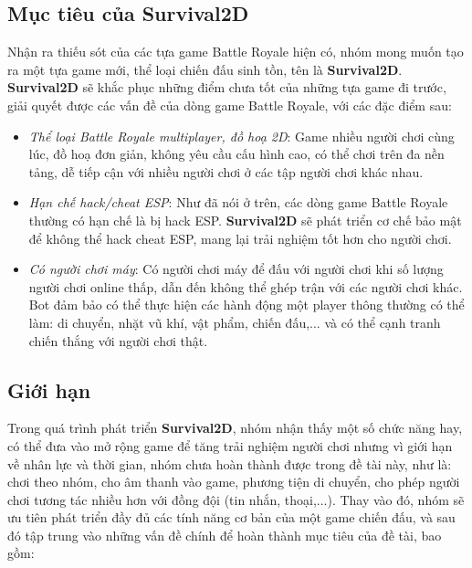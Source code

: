 \documentclass[12pt,a4paper]{article}
\begin{document}

  \subsection{Mục tiêu của Survival2D}

  Nhận ra thiếu sót của các tựa game Battle Royale hiện có, nhóm mong muốn tạo ra một tựa game mới, thể loại chiến đấu sinh tồn, tên là \textbf{Survival2D}. \textbf{Survival2D} sẽ khắc phục những điểm chưa tốt của những tựa game đi trước, giải quyết được các vấn đề của dòng game Battle Royale, với các đặc điểm sau:
  
  \begin{itemize}
      \item \textit{Thể loại Battle Royale multiplayer, đồ hoạ 2D}: Game nhiều người chơi cùng lúc, đồ hoạ đơn giản, không yêu cầu cấu hình cao, có thể chơi trên đa nền tảng, dễ tiếp cận với nhiều người chơi ở các tập người chơi khác nhau.
      \item \textit{Hạn chế hack/cheat ESP}: Như đã nói ở trên, các dòng game Battle Royale thường có hạn chế là bị hack ESP. \textbf{Survival2D} sẽ phát triển cơ chế bảo mật để không thể hack cheat ESP, mang lại trải nghiệm tốt hơn cho người chơi.
      \item \textit{Có người chơi máy}: Có người chơi máy để đấu với người chơi khi số lượng người chơi online thấp, dẫn đến không thể ghép trận với các người chơi khác. Bot đảm bảo có thể thực hiện các hành động một player thông thường có thể làm: di chuyển, nhặt vũ khí, vật phẩm, chiến đấu,... và có thể cạnh tranh chiến thắng với người chơi thật.
  \end{itemize}
  
  \subsection{Giới hạn}
  
  Trong quá trình phát triển \textbf{Survival2D}, nhóm nhận thấy một số chức năng hay, có thể đưa vào mở rộng game để tăng trải nghiệm người chơi nhưng vì giới hạn về nhân lực và thời gian, nhóm chưa hoàn thành được trong đề tài này, như là: chơi theo nhóm, cho âm thanh vào game, phương tiện di chuyển, cho phép người chơi tương tác nhiều hơn với đồng đội (tin nhắn, thoại,...). Thay vào đó, nhóm sẽ ưu tiên phát triển đầy đủ các tính năng cơ bản của một game chiến đấu, và sau đó tập trung vào những vấn đề chính để hoàn thành mục tiêu của đề tài, bao gồm:
\end{document}
